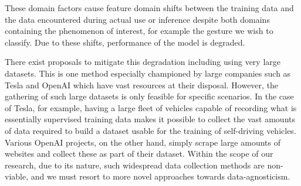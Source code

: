 These domain factors cause feature domain shifts between the training data and the data encountered during actual use or inference despite both domains containing the phenomenon of interest, for example the gesture we wish to classify.
Due to these shifts, performance of the model is degraded. 

There exist proposals to mitigate this degradation including using very large datasets.
This is one method especially championed by large companies such as Tesla and OpenAI which have vast resources at their disposal.
However, the gathering of such large datasets is only feasible for specific scenarios.
In the case of Tesla, for example, having a large fleet of vehicles capable of recording what is essentially supervised training data makes it possible to collect the vast amounts of data required to build a dataset usable for the training of self-driving vehicles.
Various OpenAI projects, on the other hand, simply scrape large amounts of websites and collect these as part of their dataset.
Within the scope of our research, due to its nature, such widespread data collection methods are non-viable, and we must resort to more novel approaches towards data-agnosticism.

